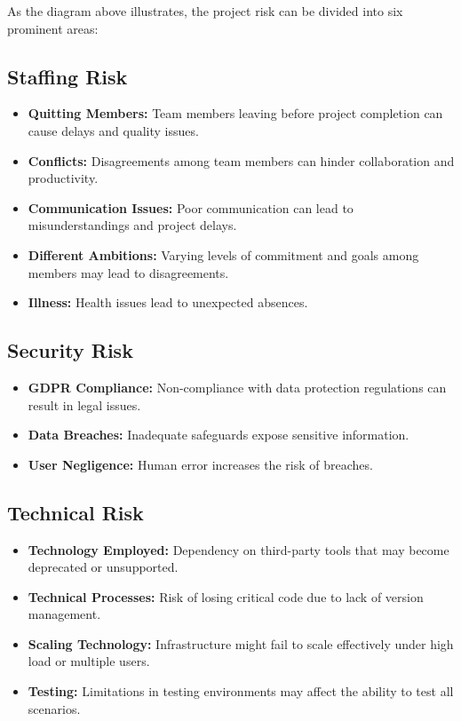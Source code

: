 As the diagram above illustrates, the project risk can be divided into six prominent areas:

\vspace{0.5cm}

\subsection{Staffing Risk}
\begin{itemize}
    \item \textbf{Quitting Members:} Team members leaving before project completion can cause delays and quality issues.
    \item \textbf{Conflicts:} Disagreements among team members can hinder collaboration and productivity.
    \item \textbf{Communication Issues:} Poor communication can lead to misunderstandings and project delays.
    \item \textbf{Different Ambitions:} Varying levels of commitment and goals among members may lead to disagreements.
    \item \textbf{Illness:} Health issues lead to unexpected absences.
\end{itemize}

\vspace{0.5cm}

\subsection{Security Risk}
\begin{itemize}
    \item \textbf{GDPR Compliance:} Non-compliance with data protection regulations can result in legal issues.
    \item \textbf{Data Breaches:} Inadequate safeguards expose sensitive information.
    \item \textbf{User Negligence:} Human error increases the risk of breaches.
\end{itemize}

\vspace{0.5cm}

\subsection{Technical Risk}
\begin{itemize}
    \item \textbf{Technology Employed:} Dependency on third-party tools that may become deprecated or unsupported.
    \item \textbf{Technical Processes:} Risk of losing critical code due to lack of version management.
    \item \textbf{Scaling Technology:} Infrastructure might fail to scale effectively under high load or multiple users.
    \item \textbf{Testing:} Limitations in testing environments may affect the ability to test all scenarios.
\end{itemize}

